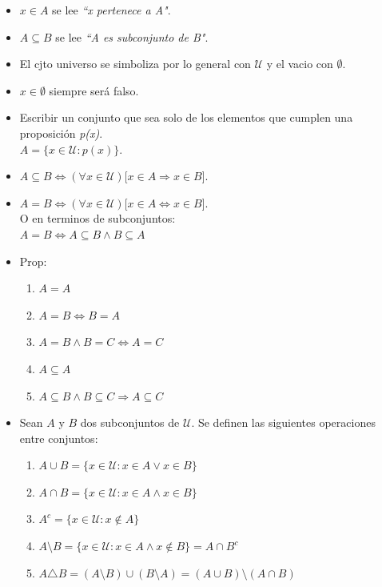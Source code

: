 \documentclass[letterpaper,11pt]{article}
\newcommand{\U}{\mathcal U}
\newcommand{\ssi}{\Longleftrightarrow} %
\theoremstyle{plain}
\begin{document}
\begin{framed}
		\begin{multicols}{2}
			\begin{itemize}
                \item $x \in A$ se lee \textit{``x pertenece a A"}.
                \item $A \subseteq B$ se lee \textit{``A es             subconjunto de B"}.
                \item El cjto universo se simboliza por lo general             con $\mathcal{U}$ y el vacio con $\emptyset$.
                \item $x \in \emptyset$ siempre será falso.
                \item Escribir un conjunto que sea solo de los         elementos que cumplen una proposición             \textit{p(x)}.\\ $A=\{x \in \mathcal{U}: p(x) \}$.
                \item $A \subseteq B \ssi (\forall x \in \U)[ x \in          A \Rightarrow x \in B$].
                \item $A = B \ssi (\forall x \in \U)[ x \in A           \Leftrightarrow x \in B$].\\
                    O en terminos de subconjuntos:\\
                        $A = B \ssi A \subseteq B \land B \subseteq A$
                        
                \item Prop: \begin{enumerate}
                                \item $A=A$
                                \item $A=B  \ssi B=A$
                                \item $A=B  \land B=C \ssi A=C$
                                \item $A \subseteq A$
                                \item $A \subseteq B \land B \subseteq C \Longrightarrow A \subseteq C$
                            \end{enumerate}
                            
                \item Sean $A$ y $B$ dos subconjuntos de $\U$. Se definen las siguientes operaciones entre conjuntos:
                    \begin{enumerate}
                        \item $A \cup B=\{x \in \U: x \in A \lor x \in B \}$
                        \item $A \cap B=\{x \in \U: x \in A \land x \in B \}$
                        \item $A^{c}=\{x \in \U: x \not \in A \}$
                        \item $A \setminus B =\{x \in \U: x \in A \land x \not \in B \}=A\cap B^{c}$
                        \item $A\triangle B= (A \setminus B) \cup (B \setminus A) = (A \cup B) \setminus (A\cap B)$
                    \end{enumerate}
                    

\end{itemize}
\end{multicols}
\end{framed}
\end{document}
